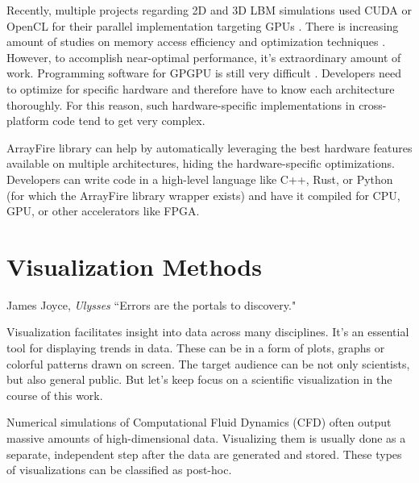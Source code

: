 Recently, multiple projects regarding 2D and 3D LBM simulations used CUDA or OpenCL for their parallel implementation targeting GPUs \citep{delboscRealTimeSimulationIndoor, delboscOptimizedImplementationLattice2014,  januszewskiSailfishFlexibleMultiGPU2014, boroniFULLGPUImplementation2017, kotsalosDigitalBloodMassively2019, kolihaOnlineVisualizationInteractive2015, szokePerformanceEvaluationTwoDimensional2017, harwoodLUMAManycoreFluid2018, harwoodParallelisationInteractiveLatticeBoltzmann2017}. There is increasing amount of studies on memory access efficiency and optimization techniques \citep{herschlagGPUDataAccess2018, tranPerformanceOptimization3D2017}. However, to accomplish near-optimal performance, it's extraordinary amount of work. Programming software for GPGPU is still very difficult \citep{malcolmArrayFireGPUAcceleration2012a}. Developers need to optimize for specific hardware and therefore have to know each architecture thoroughly. For this reason, such hardware-specific implementations in cross-platform code tend to get very complex.

ArrayFire library can help by automatically leveraging the best hardware features available on multiple architectures, hiding the hardware-specific optimizations. Developers can write code in a high-level language like C++, Rust, or Python (for which the ArrayFire library wrapper exists) and have it compiled for CPU, GPU, or other accelerators like FPGA.


\section{Visualization Methods}\label{sec:vizmethods}
\begin{chapquote}{James Joyce, \textit{Ulysses}}
	``Errors are the portals to discovery."
\end{chapquote}

Visualization facilitates insight into data across many disciplines. It's an essential tool for displaying trends in data. These can be in a form of plots, graphs or colorful patterns drawn on screen. The target audience can be not only scientists, but also general public. But let's keep focus on a scientific visualization in the course of this work. 

Numerical simulations of Computational Fluid Dynamics (CFD) often output massive amounts of high-dimensional data. Visualizing them is usually done as a separate, independent step after the data are generated and stored. These types of visualizations can be classified as post-hoc. 

